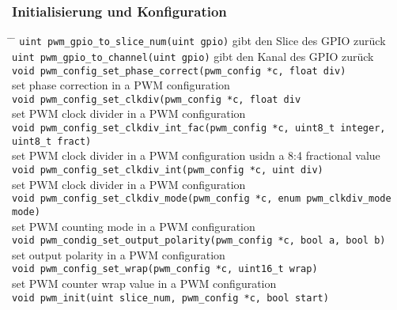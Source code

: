 \documentclass[a4paper,12pt,twoside]{article}
\begin{document}
\subsubsection{Initialisierung und Konfiguration}
\begin{tabbing}
	\hspace{5mm} \= \hspace{80mm} \= \kill
	\> \verb|uint pwm_gpio_to_slice_num(uint gpio)| \> gibt den Slice des GPIO zurück \\
	\> \verb|uint pwm_gpio_to_channel(uint gpio)| \> gibt den Kanal des GPIO zurück \\
	\> \verb|void pwm_config_set_phase_correct(pwm_config *c, float div)| \\
	\> \hspace{2mm} set phase correction in a PWM configuration \\
	\> \verb|void pwm_config_set_clkdiv(pwm_config *c, float div| \\
	\> \hspace{2mm} set PWM clock divider in a PWM configuration \\
	\> \verb|void pwm_config_set_clkdiv_int_fac(pwm_config *c, uint8_t integer, uint8_t fract)| \\
	\>  \hspace{2mm} set PWM clock divider in a PWM configuration usidn a 8:4 fractional value \\
	\> \verb|void pwm_config_set_clkdiv_int(pwm_config *c, uint div)| \\
	\>  \hspace{2mm} set PWM clock divider in a PWM configuration \\
	\> \verb|void pwm_config_set_clkdiv_mode(pwm_config *c, enum pwm_clkdiv_mode mode)| \\
	\>  \hspace{2mm} set PWM counting mode in a PWM configuration \\
	\> \verb|void pwm_condig_set_output_polarity(pwm_config *c, bool a, bool b)| \\
	\>  \hspace{2mm} set output polarity in a PWM configuration \\
	\> \verb|void pwm_config_set_wrap(pwm_config *c, uint16_t wrap)| \\
	\>  \hspace{2mm} set PWM counter wrap value in a PWM configuration \\
	\> \verb|void pwm_init(uint slice_num, pwm_config *c, bool start)| \\

\end{tabbing}
\end{document}
